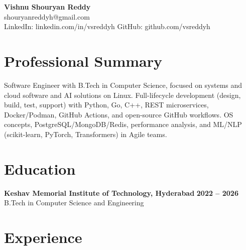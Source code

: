 \documentclass[a4paper,11pt]{article}
\newcommand{\resumeSubheading}[4]{%
  \textbf{#1} \hfill \textbf{#2} \\
{#3} \hfill {#4}
}
\begin{document}
\pagestyle{empty}
\raggedbottom
\addtolength{\textheight}{2\baselineskip}
\small

\begin{center}
  {\LARGE \textbf{Vishnu Shouryan Reddy}}\\[0.3em]
  shouryanreddyh@gmail.com \\[0.3em]
  LinkedIn: linkedin.com/in/vsreddyh \textbar{} GitHub: github.com/vsreddyh
\end{center}
\vspace{-0.8em}

\section*{Professional Summary}

Software Engineer with B.Tech in Computer Science, focused on systems and cloud software and AI solutions on Linux. Full-lifecycle development (design, build, test, support) with Python, Go, C++, REST microservices, Docker/Podman, GitHub Actions, and open-source GitHub workflows. OS concepts, PostgreSQL/MongoDB/Redis, performance analysis, and ML/NLP (scikit-learn, PyTorch, Transformers) in Agile teams.

\section*{Education}

\resumeSubheading
{Keshav Memorial Institute of Technology, Hyderabad}{2022 -- 2026}
{B.Tech in Computer Science and Engineering}{}


\section*{Experience}
\end{document}
